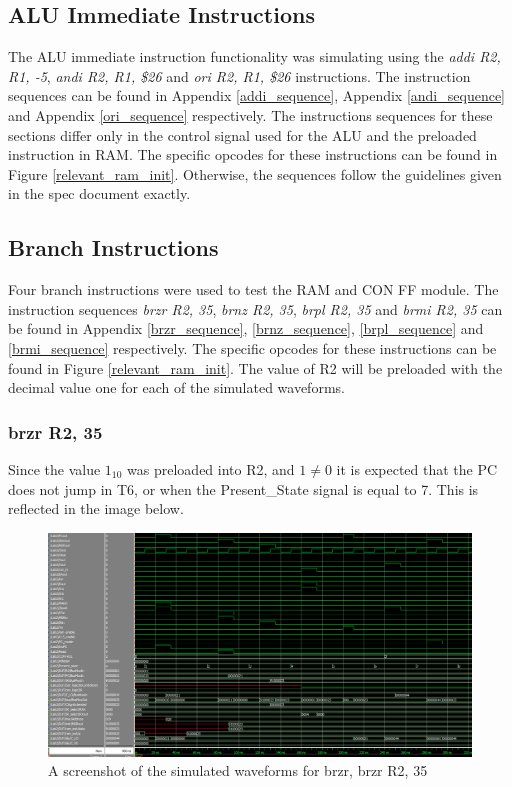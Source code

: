 \documentclass{article}
\begin{document}
    \subsection{ALU Immediate Instructions}
        The ALU immediate instruction functionality was simulating using the \emph{addi R2, R1, -5}, \emph{andi R2, R1, \$26} and \emph{ori R2, R1, \$26} instructions. The instruction sequences can be found in Appendix \ref{addi_sequence}, Appendix \ref{andi_sequence} and Appendix \ref{ori_sequence} respectively. The instructions sequences for these sections differ only in the control signal used for the ALU and the preloaded instruction in RAM. The specific opcodes for these instructions can be found in Figure \ref{relevant_ram_init}. Otherwise, the sequences follow the guidelines given in the spec document exactly.

    \subsection{Branch Instructions}
        Four branch instructions were used to test the RAM and CON FF module. The instruction sequences \emph{brzr R2, 35}, \emph{brnz R2, 35}, \emph{brpl R2, 35} and \emph{brmi R2, 35} can be found in Appendix \ref{brzr_sequence}, \ref{brnz_sequence}, \ref{brpl_sequence} and \ref{brmi_sequence} respectively. The specific opcodes for these instructions can be found in Figure \ref{relevant_ram_init}. The value of R2 will be preloaded with the decimal value one for each of the simulated waveforms. 

        \subsubsection{brzr R2, 35}
            Since the value $1_{10}$ was preloaded into R2, and $1 \neq 0$ it is expected that the PC does not jump in T6, or when the Present\_State signal is equal to 7. This is reflected in the image below.

                \begin{figure}[h!]
                    \begin{center}
                        \includegraphics[width=15cm]{brzr_wave.png}
                        \caption{A screenshot of the simulated waveforms for brzr, brzr R2, 35}
                    \end{center}
                \end{figure}
\end{document}
